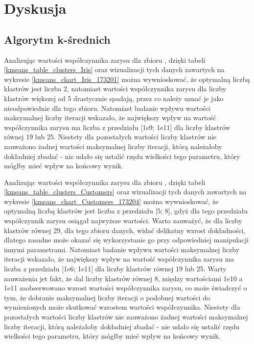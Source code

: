 \documentclass{classrep}
\begin{document}
    \section{Dyskusja}
    \label{summary} {

        \subsection{Algorytm k-średnich}
        \label{summary_1} {
            Analizując wartości współczynnika zarysu dla zbioru \cite{dataset_iris},
            dzięki tabeli \ref{kmeans_table_clusters_Iris} oraz wizualizacji tych
            danych zawartych na wykresie \ref{kmeans_chart_Iris_173201} można
            wywnioskować, że optymalną liczbą klastrów jest liczba 2, natomiast
            wartości współczynnika zarysu dla liczby klastrów większej od 5 drastycznie
            spadają, przez co należy uznać je jako nieodpowiednie dla tego zbioru. Natomiast badanie wpływu wartości maksymalnej liczby iteracji wskazało, że największy wpływ na wartość współczynnika zarysu ma liczba z przedziału [1e9; 1e11] dla liczby klastrów równej 19 lub 25. Niestety dla pozostałych wartości liczby klastrów nie zauważono żadnej wartości maksymalnej liczby iteracji, którą należałoby dokładniej zbadać - nie udało się ustalić rzędu wielkości tego parametru, który mógłby mieć wpływ na końcowy wynik.

            Analizując wartości współczynnika zarysu dla zbioru
            \cite{dataset_customers}, dzięki tabeli
            \ref{kmeans_table_clusters_Customers} oraz wizualizacji tych danych
            zawartych na wykresie \ref{kmeans_chart_Customers_173204} można
            wywnioskować, że optymalną liczbą klastrów jest liczba z przedziału [5; 8],
            gdyż dla tego przedziału współczynnik zarysu osiągał najwyższe wartości.
            Warto zauważyć, że dla liczby klastrów równej 29, dla tego zbioru danych,
            widać delikatny wzrost dokładności, dlatego zasadne może okazać się
            wykorzystanie go przy odpowiedniej manipulacji innymi parametrami. Natomiast badanie wpływu wartości maksymalnej liczby iteracji wskazało, że największy wpływ na wartość współczynnika zarysu ma liczba z przedziału [1e6; 1e11] dla liczby klastrów równej 19 lub 25. Warty zauważenia jet fakt, że dal liczby klastrów równej 8, między wartościami 1e10 a 1e11 zaobserwowano wzrost wartości współczynnika zarysu, co może świadczyć o tym, że dobranie maksymalnej liczby iteracji o podobnej wartości do wymienionych może skutkować wzrostem wartości współczynnika. Niestety dla pozostałych wartości liczby klastrów nie zauważono żadnej wartości maksymalnej liczby iteracji, którą należałoby dokładniej zbadać - nie udało się ustalić rzędu wielkości tego parametru, który mógłby mieć wpływ na końcowy wynik.

}}
\end{document}
